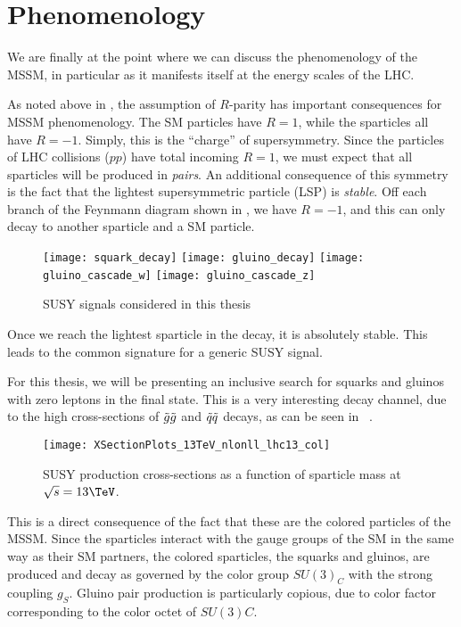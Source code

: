 \section{Phenomenology}

We are finally at the point where we can discuss the phenomenology of the MSSM, in particular as it manifests itself at the energy scales of the LHC.

As noted above in , the assumption of $R$-parity has important consequences for MSSM phenomenology.
The SM particles have $R=1$, while the sparticles all have $R=-1$.
Simply, this is the ``charge'' of supersymmetry.
Since the particles of LHC collisions ($pp$) have total incoming $R=1$, we must expect that all sparticles will be produced in \textit{pairs}.
An additional consequence of this symmetry is the fact that the lightest supersymmetric particle (LSP)  is \textit{stable}.
Off each branch of the Feynmann diagram shown in , we have $R=-1$, and this can only decay to another sparticle and a SM particle.
\begin{figure}
\caption{SUSY signals considered in this thesis}\label{fig:signal_feynmann}
\texttt{[image: squark\_decay]}
\texttt{[image: gluino\_decay]}
\texttt{[image: gluino\_cascade\_w]}
\texttt{[image: gluino\_cascade\_z]}
\end{figure}
Once we reach the lightest sparticle in the decay, it is absolutely stable.
This leads to the common signature \met for a generic SUSY signal.

For this thesis, we will be presenting an inclusive search for squarks and gluinos with zero leptons in the final state.
This is a very interesting decay channel, due to the high cross-sections of $\tilde{g} \tilde{g}$ and $\tilde{q} \tilde{q}$ decays, as can be seen in  ~\cite{Borschensky:2014cia}.

\begin{figure}\label{fig:susy_xsec}
\caption{SUSY production cross-sections as a function of sparticle mass at $\sqrt{s} = 13 \TeV$.}
\texttt{[image: XSectionPlots\_13TeV\_nlonll\_lhc13\_col]}
\end{figure}
This is a direct consequence of the fact that these are the colored particles of the MSSM.
Since the sparticles interact with the gauge groups of the SM in the same way as their SM partners, the colored sparticles, the squarks and gluinos, are produced and decay as governed by the color group $SU(3)_C$ with the strong coupling $g_S$.
Gluino pair production is particularly copious, due to color factor corresponding to the color octet of $SU(3)C$.

